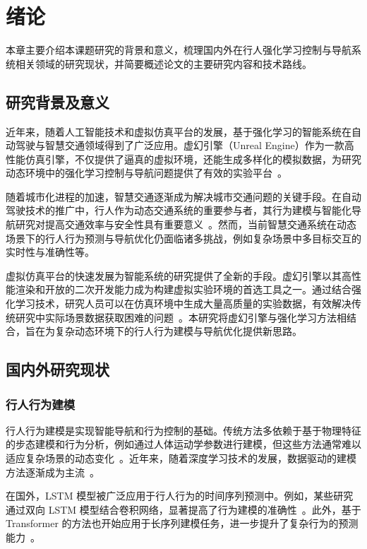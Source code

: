 
\chapter{绪论}

本章主要介绍本课题研究的背景和意义，梳理国内外在行人强化学习控制与导航系统相关领域的研究现状，并简要概述论文的主要研究内容和技术路线。

\section{研究背景及意义}

近年来，随着人工智能技术和虚拟仿真平台的发展，基于强化学习的智能系统在自动驾驶与智慧交通领域得到了广泛应用。虚幻引擎（Unreal Engine）作为一款高性能仿真引擎，不仅提供了逼真的虚拟环境，还能生成多样化的模拟数据，为研究动态环境中的强化学习控制与导航问题提供了有效的实验平台~\cite{key1,key2}。

随着城市化进程的加速，智慧交通逐渐成为解决城市交通问题的关键手段。在自动驾驶技术的推广中，行人作为动态交通系统的重要参与者，其行为建模与智能化导航研究对提高交通效率与安全性具有重要意义~\cite{key3}。然而，当前智慧交通系统在动态场景下的行人行为预测与导航优化仍面临诸多挑战，例如复杂场景中多目标交互的实时性与准确性等。

虚拟仿真平台的快速发展为智能系统的研究提供了全新的手段。虚幻引擎以其高性能渲染和开放的二次开发能力成为构建虚拟实验环境的首选工具之一。通过结合强化学习技术，研究人员可以在仿真环境中生成大量高质量的实验数据，有效解决传统研究中实际场景数据获取困难的问题~\cite{key4}。本研究将虚幻引擎与强化学习方法相结合，旨在为复杂动态环境下的行人行为建模与导航优化提供新思路。

\section{国内外研究现状}

\subsection{行人行为建模}

行人行为建模是实现智能导航和行为控制的基础。传统方法多依赖于基于物理特征的步态建模和行为分析，例如通过人体运动学参数进行建模，但这些方法通常难以适应复杂场景的动态变化~\cite{key5,key6}。近年来，随着深度学习技术的发展，数据驱动的建模方法逐渐成为主流~\cite{key7}。

在国外，LSTM 模型被广泛应用于行人行为的时间序列预测中。例如，某些研究通过双向 LSTM 模型结合卷积网络，显著提高了行为建模的准确性~\cite{key8}。此外，基于 Transformer 的方法也开始应用于长序列建模任务，进一步提升了复杂行为的预测能力~\cite{key9}。

